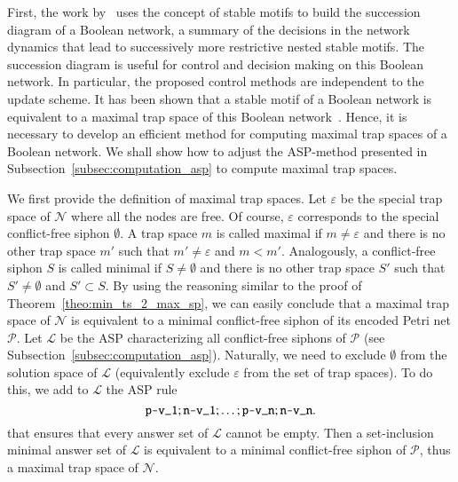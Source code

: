 \documentclass[preprint,12pt]{elsarticle}
\begin{document}
First, the work by~\cite{Rozum2021} uses the concept of stable motifs to build the succession diagram of a Boolean network, a summary of the decisions in the network dynamics that lead to successively more restrictive nested stable motifs.
The succession diagram is useful for control and decision making on this Boolean network.
In particular, the proposed control methods are independent to the update scheme.
It has been shown that a stable motif of a Boolean network is equivalent to a maximal trap space of this Boolean network~\cite{Rozum2021}.
Hence, it is necessary to develop an efficient method for computing maximal trap spaces of a Boolean network.
We shall show how to adjust the ASP-method presented in Subsection~\ref{subsec:computation_asp} to compute maximal trap spaces.

We first provide the definition of maximal trap spaces.
Let \(\varepsilon\) be the special trap space of \(\mathcal{N}\) where all the nodes are free.
Of course, \(\varepsilon\) corresponds to the special conflict-free siphon \(\emptyset\).
A trap space \(m\) is called maximal if \(m \neq \varepsilon\) and there is no other trap space \(m'\) such that \(m' \neq \varepsilon\) and \(m < m'\).
Analogously, a conflict-free siphon \(S\) is called minimal if \(S \neq \emptyset\) and there is no other trap space \(S'\) such that \(S' \neq \emptyset\) and \(S' \subset S\).
By using the reasoning similar to the proof of Theorem~\ref{theo:min_ts_2_max_sp}, we can easily conclude that a maximal trap space of \(\mathcal{N}\) is equivalent to a minimal conflict-free siphon of its encoded Petri net \(\mathcal{P}\).
Let \(\mathcal{L}\) be the ASP characterizing all conflict-free siphons of \(\mathcal{P}\) (see Subsection~\ref{subsec:computation_asp}).
Naturally, we need to exclude \(\emptyset\) from the solution space of \(\mathcal{L}\) (equivalently exclude \(\varepsilon\) from the set of trap spaces).
To do this, we add to \(\mathcal{L}\) the ASP rule
\[
  \verb|p-v_1| ; \verb|n-v_1| ; \dots ; \verb|p-v_n| ; \verb|n-v_n|.
\]
that ensures that every answer set of \(\mathcal{L}\) cannot be empty.
Then a set-inclusion minimal answer set of \(\mathcal{L}\) is equivalent to a minimal conflict-free siphon of \(\mathcal{P}\), thus a maximal trap space of \(\mathcal{N}\).
\end{document}
